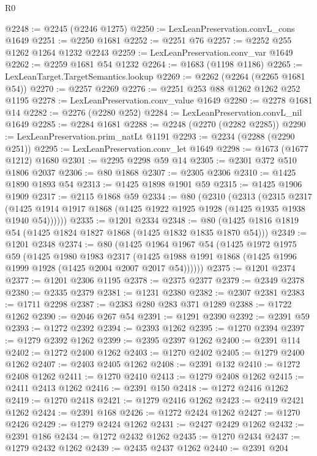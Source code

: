 \begin{lexlean}{R0}
\begin{coremodule}
@2248 := @2245 (@2246 @1275)
@2250 := LexLeanPreservation.convL_cons @1649
@2251 := @2250 @1681
@2252 := @2251 @76
@2257 := @2252 @255 @1262 @1264 @1232 @2243
@2259 := LexLeanPreservation.conv_var @1649
@2262 := @2259 @1681 @54 @1232
@2264 := @1683 (@1198 @1186)
@2265 := LexLeanTarget.TargetSemantics.lookup
@2269 := @2262 (@2264 (@2265 @1681 @54))
@2270 := @2257 @2269
@2276 := @2251 @253 @88 @1262 @1262 @252 @1195
@2278 := LexLeanPreservation.conv_value @1649
@2280 := @2278 @1681 @14
@2282 := @2276 (@2280 @252)
@2284 := LexLeanPreservation.convL_nil @1649
@2285 := @2284 @1681
@2288 := @2248 (@2270 (@2282 @2285))
@2290 := LexLeanPreservation.prim_natLt @1191
@2293 := @2234 (@2288 (@2290 @251))
@2295 := LexLeanPreservation.conv_let @1649
@2298 := @1673 (@1677 @1212) @1680
@2301 := @2295 @2298 @59 @14
@2305 := @2301 @372 @510 @1806 @2037
@2306 := @80 @1868
@2307 := @2305 @2306
@2310 := @1425 @1890 @1893 @54
@2313 := @1425 @1898 @1901 @59
@2315 := @1425 @1906 @1909
@2317 := @2115 @1868 @59
@2334 := @80
    (@2310
      (@2313
        (@2315
          @2317
          (@1425 @1914 @1917 @1868 (@1425 @1922 @1925 @1928 (@1425 @1935 @1938 @1940 @54))))))
@2335 := @1201 @2334
@2348 := @80 (@1425 @1816 @1819 @54 (@1425 @1824 @1827 @1868 (@1425 @1832 @1835 @1870 @54)))
@2349 := @1201 @2348
@2374 := @80
    (@1425
      @1964
      @1967
      @54
      (@1425
        @1972
        @1975
        @59
        (@1425
          @1980
          @1983
          @2317
          (@1425 @1988 @1991 @1868 (@1425 @1996 @1999 @1928 (@1425 @2004 @2007 @2017 @54))))))
@2375 := @1201 @2374
@2377 := @1201 @2306 @1195
@2378 := @2375 @2377
@2379 := @2349 @2378
@2380 := @2335 @2379
@2381 := @1231 @2380
@2382 := @2307 @2381
@2383 := @1711 @2298
@2387 := @2383 @280 @283 @371 @1289
@2388 := @1722 @1262
@2390 := @2046 @267 @54
@2391 := @1291 @2390
@2392 := @2391 @59
@2393 := @1272 @2392
@2394 := @2393 @1262
@2395 := @1270 @2394
@2397 := @1279 @2392 @1262
@2399 := @2395 @2397 @1262
@2400 := @2391 @114
@2402 := @1272 @2400 @1262
@2403 := @1270 @2402
@2405 := @1279 @2400 @1262
@2407 := @2403 @2405 @1262
@2408 := @2391 @132
@2410 := @1272 @2408 @1262
@2411 := @1270 @2410
@2413 := @1279 @2408 @1262
@2415 := @2411 @2413 @1262
@2416 := @2391 @150
@2418 := @1272 @2416 @1262
@2419 := @1270 @2418
@2421 := @1279 @2416 @1262
@2423 := @2419 @2421 @1262
@2424 := @2391 @168
@2426 := @1272 @2424 @1262
@2427 := @1270 @2426
@2429 := @1279 @2424 @1262
@2431 := @2427 @2429 @1262
@2432 := @2391 @186
@2434 := @1272 @2432 @1262
@2435 := @1270 @2434
@2437 := @1279 @2432 @1262
@2439 := @2435 @2437 @1262
@2440 := @2391 @204

\end{coremodule}
\end{lexlean}
